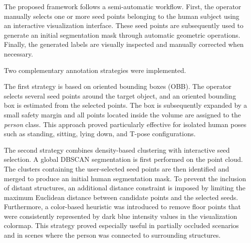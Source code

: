 The proposed framework follows a semi-automatic workflow. First, the operator manually selects one or more seed points belonging to the human subject using an interactive visualization interface. These seed points are subsequently used to generate an initial segmentation mask through automatic geometric operations. Finally, the generated labels are visually inspected and manually corrected when necessary.

Two complementary annotation strategies were implemented.

The first strategy is based on oriented bounding boxes (OBB). The operator selects several seed points around the target object, and an oriented bounding box is estimated from the selected points. The box is subsequently expanded by a small safety margin and all points located inside the volume are assigned to the \textit{person} class. This approach proved particularly effective for isolated human poses such as standing, sitting, lying down, and T-pose configurations.

The second strategy combines density-based clustering with interactive seed selection. A global DBSCAN segmentation is first performed on the point cloud. The clusters containing the user-selected seed points are then identified and merged to produce an initial human segmentation mask. To prevent the inclusion of distant structures, an additional distance constraint is imposed by limiting the maximum Euclidean distance between candidate points and the selected seeds. Furthermore, a color-based heuristic was introduced to remove floor points that were consistently represented by dark blue intensity values in the visualization colormap. This strategy proved especially useful in partially occluded scenarios and in scenes where the person was connected to surrounding structures.

